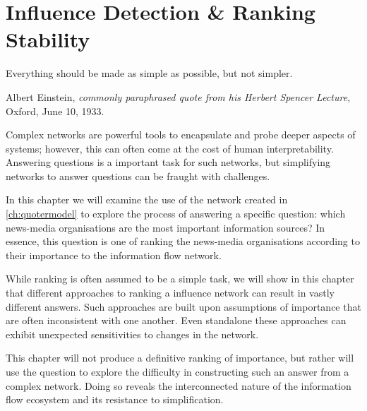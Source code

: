 \chapter{Influence Detection \& Ranking Stability }\label{ch:ranking}


\epigraph{Everything should be made as simple as possible, but not simpler.}{Albert Einstein, {\em commonly paraphrased quote from his Herbert Spencer Lecture}, Oxford, June 10, 1933.}

Complex networks are powerful tools to encapsulate and probe deeper aspects of systems; however, this can often come at the cost of human interpretability. Answering questions is a important task for such networks, but simplifying networks to answer questions can be fraught with challenges.

In this chapter we will examine the use of the network created in \autoref{ch:quotermodel} to explore the process of answering a specific question: which news-media organisations are the most important information sources? In essence, this question is one of ranking the news-media organisations according to their importance to the information flow network. 

While ranking is often assumed to be a simple task, we will show in this chapter that different approaches to ranking a influence network can result in vastly different answers. Such approaches are built upon assumptions of importance that are often inconsistent with one another. Even standalone these approaches can exhibit unexpected sensitivities to changes in the network.

This chapter will not produce a definitive ranking of importance, but rather will use the question to explore the difficulty in constructing such an answer from a complex network. Doing so reveals the interconnected nature of the information flow ecosystem and its resistance to simplification.



